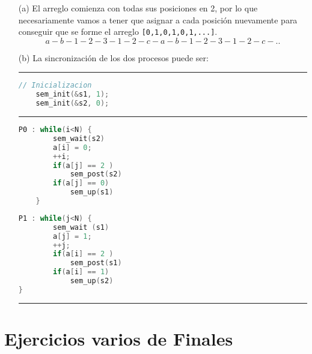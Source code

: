 \documentclass[openany]{book}
\begin{document}
\begin{rta}
    \begin{itemize}
        \item[(a)] El arreglo comienza con todas sus posiciones en 2, por lo que necesariamente vamos a tener que asignar a cada posición nuevamente para conseguir que se forme el arreglo \texttt{[0,1,0,1,0,1,...]}.
        \begin{equation*}
            a-b-1-2-3-1-2-c-a-b-1-2-3-1-2-c-..
        \end{equation*}
        \item[(b)] La sincronización de los dos procesos puede ser:
        \hrule
\begin{lstlisting}[language=C]
    // Inicializacion
    sem_init(&s1, 1);
    sem_init(&s2, 0);
\end{lstlisting}
        \hrule
        \begin{minipage}{0.48\textwidth}
\begin{lstlisting}[language=C]
P0 : while(i<N) {
        sem_wait(s2) 
        a[i] = 0;
        ++i;
        if(a[j] == 2 )
            sem_post(s2)
        if(a[j] == 0)
            sem_up(s1)
    }
\end{lstlisting}
        \end{minipage}
        \begin{minipage}{0.48\textwidth}
\begin{lstlisting}[language=C]
P1 : while(j<N) {
        sem_wait (s1)
        a[j] = 1;
        ++j; 
        if(a[i] == 2 )
            sem_post(s1)
        if(a[i] == 1)
            sem_up(s2)
}
\end{lstlisting}
        \end{minipage}
        \hrule
    \end{itemize}
\end{rta}

\section*{Ejercicios varios de Finales}

\begin{tcolorbox}[
    colback=blue!20,     %
    colframe=blue!60,    %
    coltitle=white,       %
    fonttitle=\bfseries,  %
    title=Mas ejercicios resueltos de finales,  %
    boxrule=1mm,          %
    rounded corners       %
]
    \centering
    \href{https://docs.google.com/document/d/1TnR4tz7d3oO_W2JgDb4LBbVTPm8GJsVt6f6tmIMFfSs/edit?usp=sharing}{\textbf{\textcolor{white}{\fboxsep=1pt}}}
\end{tcolorbox}
\end{document}
